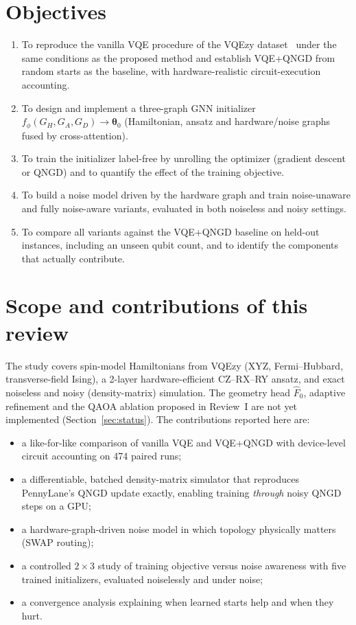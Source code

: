 \documentclass{ssnreview}
\begin{document}
\section{Objectives}
\begin{enumerate}[label=\arabic*.]
  \item To reproduce the vanilla VQE procedure of the VQEzy dataset~\cite{vqezy} under the same
        conditions as the proposed method and establish VQE+QNGD from random starts as the
        baseline, with hardware-realistic circuit-execution accounting.
  \item To design and implement a three-graph GNN initializer
        $f_\phi(G_H,G_A,G_D)\to\boldsymbol\theta_0$ (Hamiltonian, ansatz and hardware/noise graphs
        fused by cross-attention).
  \item To train the initializer label-free by unrolling the optimizer (gradient descent or
        QNGD) and to quantify the effect of the training objective.
  \item To build a noise model driven by the hardware graph and train noise-unaware and fully
        noise-aware variants, evaluated in both noiseless and noisy settings.
  \item To compare all variants against the VQE+QNGD baseline on held-out instances, including
        an unseen qubit count, and to identify the components that actually contribute.
\end{enumerate}

\section{Scope and contributions of this review}
The study covers spin-model Hamiltonians from VQEzy (XYZ, Fermi--Hubbard, transverse-field
Ising), a 2-layer hardware-efficient CZ--RX--RY ansatz, and exact noiseless and noisy
(density-matrix) simulation. The geometry head $\hat F_0$, adaptive refinement and the QAOA
ablation proposed in Review~I are not yet implemented (Section~\ref{sec:status}).
The contributions reported here are:
\begin{itemize}
  \item a like-for-like comparison of vanilla VQE and VQE+QNGD with device-level circuit
        accounting on 474 paired runs;
  \item a differentiable, batched density-matrix simulator that reproduces PennyLane's QNGD
        update exactly, enabling training \emph{through} noisy QNGD steps on a GPU;
  \item a hardware-graph-driven noise model in which topology physically matters (SWAP routing);
  \item a controlled $2\times3$ study of training objective versus noise awareness with five
        trained initializers, evaluated noiselessly and under noise;
  \item a convergence analysis explaining when learned starts help and when they hurt.
\end{itemize}
\end{document}
